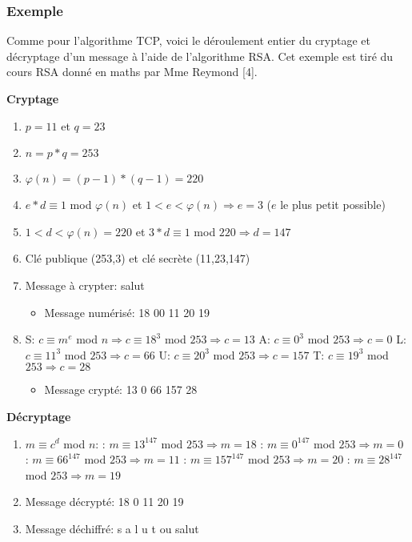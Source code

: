 \documentclass[a4paper,12pt]{report}
\begin{document}
\subsubsection{Exemple}

Comme pour l'algorithme TCP, voici le déroulement entier du cryptage et décryptage d'un message à l'aide de l'algorithme RSA. Cet exemple est tiré du cours RSA donné en maths par Mme Reymond [4].\newline

\textbf{Cryptage}

\begin{enumerate}
\item $p = 11$ et $q = 23$
\item $n = p*q = 253$ \newline
\item $\varphi(n) = (p-1)*(q-1) = 220$
\item $e*d \equiv 1$ mod $\varphi(n)$ et $1 < e < \varphi(n) \Rightarrow e = 3$ ($e$ le plus petit possible)
\item $1 < d < \varphi(n) = 220$ et $3*d \equiv 1$ mod $220 \Rightarrow d = 147$
\item Clé publique (253,3) et clé secrète (11,23,147)
\item Message à crypter: salut
\begin{itemize}
\item Message numérisé: 18 00 11 20 19
\end{itemize}
\item S: $c \equiv m^e$ mod $n \Rightarrow c \equiv 18^3$ mod $253 \Rightarrow c = 13$ \newline
A: $c \equiv 0^3$ mod $253 \Rightarrow c = 0$ \newline
L: $c \equiv 11^3$ mod $253 \Rightarrow c = 66$ \newline
U: $c \equiv 20^3$ mod $253 \Rightarrow c = 157$ \newline
T: $c \equiv 19^3$ mod $253 \Rightarrow c = 28$
\begin{itemize}
\item Message crypté: 13 0 66 157 28
\end{itemize}
\end{enumerate}


\textbf{Décryptage}

\begin{enumerate}
\item $m \equiv c^d$ mod $n$: : $m \equiv 13^{147}$ mod $253 \Rightarrow m = 18$ : $m \equiv 0^{147}$ mod $253 \Rightarrow m = 0$ : $m \equiv 66^{147}$ mod $253 \Rightarrow m = 11$ : $m \equiv 157^{147}$ mod $253 \Rightarrow m = 20$ : $m \equiv 28^{147}$ mod $253 \Rightarrow m = 19$
\item Message décrypté: 18 0 11 20 19
\item Message déchiffré: s a l u t ou salut
\end{enumerate}
\end{document}
